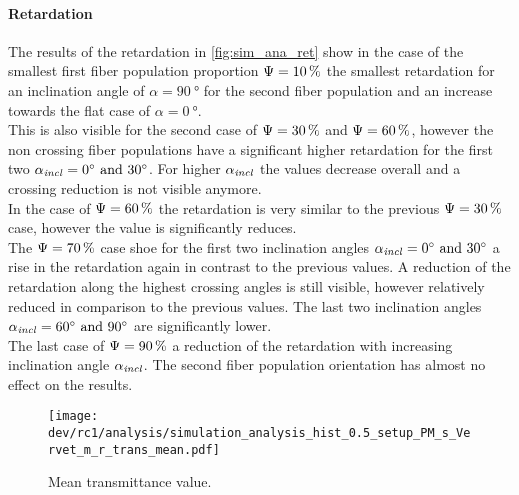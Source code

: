 \paragraph{Retardation}
The results of the retardation in \cref{fig:sim_ana_ret} show in the case of the smallest first fiber population proportion $\textnormal{$\Psi$}=\SI{10}{\percent}$ the smallest retardation for an inclination angle of $\alpha=\SI{90}{\degree}$ for the second fiber population and an increase towards the flat case of $\alpha=\SI{0}{\degree}$.
\\
% 
This is also visible for the second case of $\textnormal{$\Psi$}=\SI{30}{\percent}$ and $\textnormal{$\Psi$}=\SI{60}{\percent}$, however the non crossing fiber populations have a significant higher retardation for the first two $\modelInc = \SIlist{0;30}{\degree}$.
For higher $\textnormal{$\alpha_{\mathit{incl}}$}$ the values decrease overall and a crossing reduction is not visible anymore.
\\
In the case of $\textnormal{$\Psi$}=\SI{60}{\percent}$ the retardation is very similar to the previous $\textnormal{$\Psi$}=\SI{30}{\percent}$ case, however the value is significantly reduces.
% 
\\
The $\textnormal{$\Psi$}=\SI{70}{\percent}$ case shoe for the first two inclination angles $\modelInc=\SIlist{0;30}{\degree}$ a rise in the retardation again in contrast to the previous values.
A reduction of the retardation along the highest crossing angles is still visible, however relatively reduced in comparison to the previous values.
The last two inclination angles $\modelInc=\SIlist{60;90}{\degree}$ are significantly lower.
\\
%
The last case of $\textnormal{$\Psi$}=\SI{90}{\percent}$ a reduction of the retardation with increasing inclination angle $\textnormal{$\alpha_{\mathit{incl}}$}$.
The second fiber population orientation has almost no effect on the results.
% 
% 
% 
\begin{figure}[!p]
\centering
\texttt{[image: dev/rc1/analysis/simulation\_analysis\_hist\_0.5\_setup\_PM\_s\_Vervet\_m\_r\_trans\_mean.pdf]}
\caption[Simulation transmittance]{Mean transmittance value.}
\label{fig:sim_ana_trans}
\end{figure}
% 

